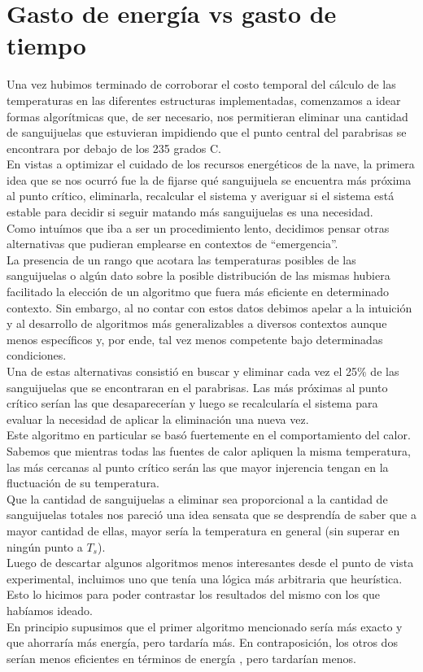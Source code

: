\documentclass[double, 1.5in, 12pt]{beavtex}
\begin{document}
\section{Gasto de energ\'ia vs gasto de tiempo}
Una vez hubimos terminado de corroborar el costo temporal del c\'alculo de las temperaturas en las diferentes estructuras implementadas, comenzamos a idear formas algor\'itmicas que, de ser necesario, nos permitieran eliminar una cantidad de sanguijuelas que estuvieran impidiendo que el punto central del parabrisas se encontrara por debajo de los 235 grados C. \\
En vistas a optimizar el cuidado de los recursos energ\'eticos de la nave, la primera idea que se nos ocurr\'o fue la de fijarse qu\'e sanguijuela se encuentra m\'as próxima al punto cr\'itico, eliminarla, recalcular el sistema y averiguar si el sistema est\'a estable para decidir si seguir matando m\'as sanguijuelas es una necesidad. \\
Como intu\'imos que iba a ser un procedimiento lento, decidimos pensar otras alternativas que pudieran emplearse en contextos de “emergencia”. \\
La presencia de un rango que acotara las temperaturas posibles de las sanguijuelas o alg\'un dato sobre la posible distribuci\'on de las mismas hubiera facilitado la elecci\'on de un algoritmo que fuera m\'as eficiente en determinado contexto. Sin embargo, al no contar con estos datos debimos apelar a la intuici\'on y al desarrollo de algoritmos m\'as generalizables a diversos contextos aunque menos espec\'ificos y, por ende, tal vez menos competente bajo determinadas condiciones. \\
Una de estas alternativas consisti\'o en buscar y eliminar cada vez el 25$\%$ de las sanguijuelas que se encontraran en el parabrisas. Las m\'as próximas al punto cr\'itico serían las que desaparecer\'ian y luego se recalcular\'ia el sistema para evaluar la necesidad de aplicar la eliminaci\'on una nueva vez. \\
Este algoritmo en particular se bas\'o fuertemente en el comportamiento del calor. Sabemos que mientras todas las fuentes de calor apliquen la misma temperatura, las m\'as cercanas al punto cr\'itico ser\'an las que mayor injerencia tengan en la fluctuaci\'on de su temperatura.  \\
Que la cantidad de sanguijuelas a eliminar sea proporcional a la cantidad de sanguijuelas totales nos pareci\'o una idea sensata que se desprend\'ia de saber que a mayor cantidad de ellas, mayor ser\'ia la temperatura en general (sin superar en ning\'un punto a $T_s$). \\
Luego de descartar algunos algoritmos menos interesantes desde el punto de vista experimental, incluimos uno que tenía una l\'ogica m\'as arbitraria que heur\'istica. Esto lo hicimos para poder contrastar los resultados del mismo con los que habíamos ideado.\\
En principio supusimos que el primer algoritmo mencionado ser\'ia m\'as exacto y que ahorrar\'ia m\'as energ\'ia, pero tardar\'ia m\'as. En contraposici\'on, los otros dos ser\'ian menos eficientes en t\'erminos de energ\'ia , pero tardar\'ian menos.  \\
\end{document}
